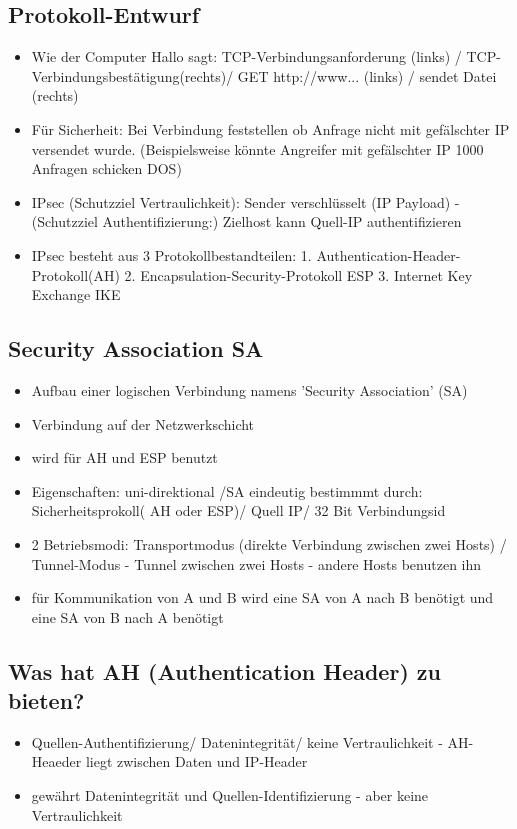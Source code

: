 \documentclass[a4paper,10pt]{scrartcl}
\begin{document}
\subsection{Protokoll-Entwurf}

\begin{itemize}
 \item Wie der Computer Hallo sagt: TCP-Verbindungsanforderung (links) / TCP-Verbindungsbestätigung(rechts)/ GET http://www... (links) / sendet Datei (rechts)
 \item Für Sicherheit: Bei Verbindung feststellen ob Anfrage nicht mit gefälschter IP versendet wurde. (Beispielsweise könnte  Angreifer mit gefälschter IP 1000 Anfragen 
 schicken DOS)
 \item IPsec (Schutzziel Vertraulichkeit): Sender verschlüsselt (IP Payload) - (Schutzziel Authentifizierung:) Zielhost kann Quell-IP authentifizieren
 \item IPsec besteht aus 3 Protokollbestandteilen: 1. Authentication-Header-Protokoll(AH) 2. Encapsulation-Security-Protokoll ESP 3. Internet Key Exchange IKE
 
\end{itemize}

\subsection{Security Association SA}
\begin{itemize}
\item Aufbau einer logischen Verbindung namens 'Security Association' (SA)
\item Verbindung auf der Netzwerkschicht
\item wird für AH und ESP benutzt
\item Eigenschaften: uni-direktional /SA eindeutig bestimmmt durch: Sicherheitsprokoll( AH oder ESP)/ Quell IP/ 32 Bit Verbindungsid
\item 2 Betriebsmodi: Transportmodus (direkte Verbindung zwischen zwei Hosts) / Tunnel-Modus - Tunnel zwischen zwei Hosts - andere Hosts benutzen ihn
\item für Kommunikation von A und B wird eine SA von A nach B benötigt und eine SA von B nach A benötigt
\end{itemize}

\subsection{Was hat AH (Authentication Header) zu bieten?}
\begin{itemize}
 \item Quellen-Authentifizierung/ Datenintegrität/ keine Vertraulichkeit - AH-Heaeder liegt zwischen Daten und IP-Header
 \item gewährt Datenintegrität und Quellen-Identifizierung - aber keine Vertraulichkeit
\end{itemize}
\end{document}
